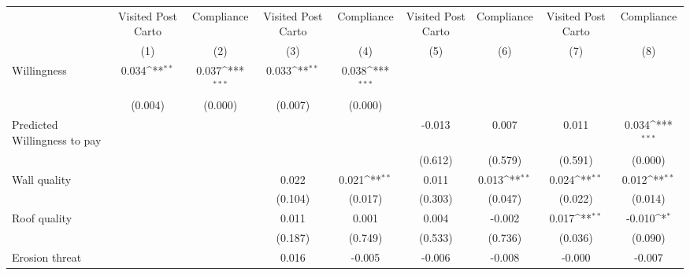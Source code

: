 {
\def\sym#1{\ifmmode^{#1}\else\(^{#1}\)\fi}
\begin{tabular}{l*{8}{c}}
\toprule
                &\multicolumn{1}{c}{Visited Post Carto}&\multicolumn{1}{c}{Compliance}&\multicolumn{1}{c}{Visited Post Carto}&\multicolumn{1}{c}{Compliance}&\multicolumn{1}{c}{Visited Post Carto}&\multicolumn{1}{c}{Compliance}&\multicolumn{1}{c}{Visited Post Carto}&\multicolumn{1}{c}{Compliance}\\
                &\multicolumn{1}{c}{(1)}         &\multicolumn{1}{c}{(2)}         &\multicolumn{1}{c}{(3)}         &\multicolumn{1}{c}{(4)}         &\multicolumn{1}{c}{(5)}         &\multicolumn{1}{c}{(6)}         &\multicolumn{1}{c}{(7)}         &\multicolumn{1}{c}{(8)}         \\
\midrule
Willingness     &    0.034\sym{**} &    0.037\sym{***}&    0.033\sym{**} &    0.038\sym{***}&                  &                  &                  &                  \\
                &  (0.004)         &  (0.000)         &  (0.007)         &  (0.000)         &                  &                  &                  &                  \\
Predicted Willingness to pay&                  &                  &                  &                  &   -0.013         &    0.007         &    0.011         &    0.034\sym{***}\\
                &                  &                  &                  &                  &  (0.612)         &  (0.579)         &  (0.591)         &  (0.000)         \\
Wall quality    &                  &                  &    0.022         &    0.021\sym{**} &    0.011         &    0.013\sym{**} &    0.024\sym{**} &    0.012\sym{**} \\
                &                  &                  &  (0.104)         &  (0.017)         &  (0.303)         &  (0.047)         &  (0.022)         &  (0.014)         \\
Roof quality    &                  &                  &    0.011         &    0.001         &    0.004         &   -0.002         &    0.017\sym{**} &   -0.010\sym{*}  \\
                &                  &                  &  (0.187)         &  (0.749)         &  (0.533)         &  (0.736)         &  (0.036)         &  (0.090)         \\
Erosion threat  &                  &                  &    0.016         &   -0.005         &   -0.006         &   -0.008         &   -0.000         &   -0.007         \\

\end{tabular}}
